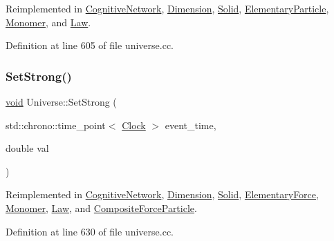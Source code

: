 Reimplemented in \mbox{\hyperlink{class_cognitive_network_a3fc6d08413bfd4350f94d6f2627eedc7}{Cognitive\+Network}}, \mbox{\hyperlink{class_dimension_a8d73c050c67b0226572b4a1b08ae6594}{Dimension}}, \mbox{\hyperlink{class_solid_a615cb8d1ec1376781726bcefa86339cb}{Solid}}, \mbox{\hyperlink{class_elementary_particle_a437fa86d88157314b84662b158d52353}{Elementary\+Particle}}, \mbox{\hyperlink{class_monomer_ad24a86a4c1ac62d1b0ce8040d6b08adf}{Monomer}}, and \mbox{\hyperlink{class_law_a3de75edea5e20db0a7b731de61f07dea}{Law}}.



Definition at line 605 of file universe.\+cc.

\mbox{\label{class_universe_a5946c8f3d4cda305f3ecd10df21a2f94}} 
\subsubsection{\texorpdfstring{Set\+Strong()}{SetStrong()}}
{\footnotesize\ttfamily \mbox{\hyperlink{glad_8h_a950fc91edb4504f62f1c577bf4727c29}{void}} Universe\+::\+Set\+Strong (\begin{DoxyParamCaption}\item[{std\+::chrono\+::time\+\_\+point$<$ \mbox{\hyperlink{universe_8h_a0ef8d951d1ca5ab3cfaf7ab4c7a6fd80}{Clock}} $>$}]{event\+\_\+time,  }\item[{double}]{val }\end{DoxyParamCaption})\hspace{0.3cm}{\ttfamily [virtual]}}



Reimplemented in \mbox{\hyperlink{class_cognitive_network_a50f2a12c9873e623d6247318b041ba30}{Cognitive\+Network}}, \mbox{\hyperlink{class_dimension_ab9021cb6727ed590026bf870c638576d}{Dimension}}, \mbox{\hyperlink{class_solid_a478e15cdf15c5bb01cbcbd5f584ef83a}{Solid}}, \mbox{\hyperlink{class_elementary_force_aa1b5708cfab2069049fec5c924e1f246}{Elementary\+Force}}, \mbox{\hyperlink{class_monomer_a10b864f6bcad43f11a2316dbbe4c4742}{Monomer}}, \mbox{\hyperlink{class_law_a4cd0dd1908edbd02090dd1ba1387d722}{Law}}, and \mbox{\hyperlink{class_composite_force_particle_a06488ef0457335648b161d3ed746b643}{Composite\+Force\+Particle}}.



Definition at line 630 of file universe.\+cc.

\mbox{\label{class_universe_aafec97a231126b71c73ac1258609a284}} 
